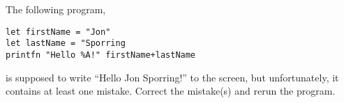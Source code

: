 The following program,
\begin{lstlisting}
let firstName = "Jon"
let lastName = "Sporring
printfn "Hello %A!" firstName+lastName
\end{lstlisting}
is supposed to write ``Hello Jon Sporring!'' to the screen, but
unfortunately, it contains at least one mistake. Correct the
mistake(s) and rerun the program. 

